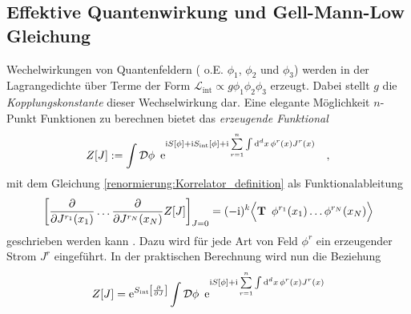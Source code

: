     
  \subsection{Effektive Quantenwirkung und Gell-Mann-Low Gleichung}
    Wechelwirkungen von Quantenfeldern ( o.E. $\phi_1$, $\phi_2$ und $\phi_3$) 
    werden in der 
    Lagrangedichte über Terme der Form $\mathcal{L}_\text{int} 
    \propto g \phi_1 \phi_2 \phi_3$ erzeugt. Dabei stellt $g$ die 
    \textit{Kopplungskonstante} dieser Wechselwirkung dar. Eine elegante 
    Möglichkeit $n$-Punkt Funktionen zu berechnen bietet das \textit{erzeugende 
    Funktional}
    \begin{equation}
    Z[J] := \int \mathcal{D}\phi \,\,\, \text{e}^{\text{i} S[\phi]+ \text{i} S_\text{int}[\phi] +
    \text{i} \sum\limits_{r=1}^n
    \int \text{d}^d x \, \phi^r(x)J^r(x)} \quad ,
    \label{renormierung:erzeugendes_Funktional_definition} 
    \end{equation}
    mit dem Gleichung \eqref{renormierung:Korrelator_definition} als 
    Funktionalableitung
    \begin{equation}
    \left[ \frac{\partial}{\partial J^{r_1}(x_1)} \ldots 
    \frac{\partial}{\partial J^{r_N}(x_N)}  Z[J] \right]_{J=0} =
    (-\text{i})^k \Big\langle \textbf{T} \,\,\, \phi^{r_1} (x_1) \ldots 
    \phi^{r_N} (x_N)\Big\rangle 
    \end{equation}
    geschrieben werden kann \cite{Schwartz}. Dazu wird für jede Art von 
    Feld $\phi^r$ ein erzeugender Strom $J^r$ eingeführt. In der praktischen 
    Berechnung wird nun die Beziehung
    \begin{equation}
     Z[J] = \text{e}^{S_\text{int}\left[\frac{\partial}{\partial J}\right]} 
      \int \mathcal{D}\phi \,\,\, \text{e}^{\text{i} S[\phi]+
    \text{i} \sum\limits_{r=1}^n
    \int \text{d}^d x \, \phi^r(x)J^r(x)} 
    \end{equation}


